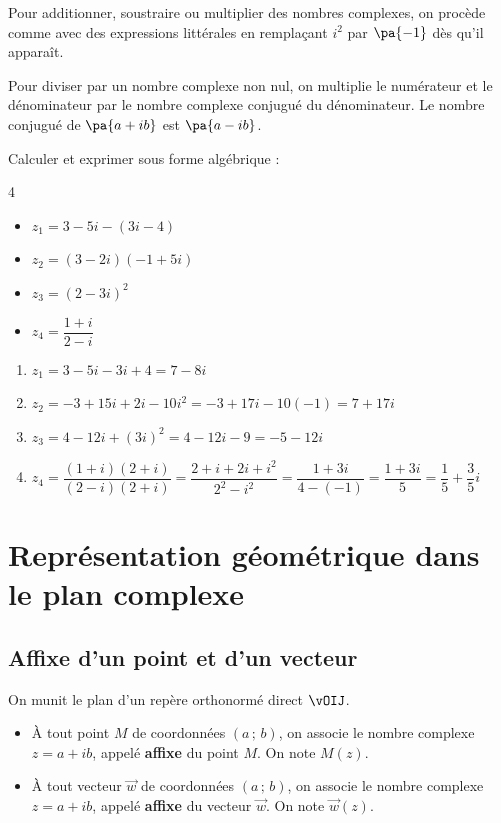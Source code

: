 \begin{methode}
	Pour additionner, soustraire ou multiplier des nombres complexes, on procède comme avec des expressions littérales en remplaçant $i^2$ par $\pa{-1}$ dès qu'il apparaît.

	Pour diviser par un nombre complexe non nul, on multiplie le numérateur et le dénominateur par le nombre complexe conjugué du dénominateur. Le nombre conjugué de $\pa{a+ib}$ est $\pa{a-ib}$.

	Calculer et exprimer sous forme algébrique :
	\begin{multicols}{4}
		\begin{itemize}
			\item $z_1 = 3 - 5i - (3i - 4)$
			\item $z_2 = (3 - 2i)(-1 + 5i)$
			\item $z_3 = (2 - 3i)^2$
			\item $z_4 = \dfrac{1 + i}{2 - i}$
		\end{itemize}
	\end{multicols}

	\ms

	\begin{correction}
		\nline
		\begin{enumerate}
			\item $z_1 = 3 - 5i - 3i + 4 = 7 - 8i$
			\item $z_2 = -3 + 15i + 2i - 10i^2 = -3 + 17i - 10(-1) = 7 + 17i$
			\item $z_3 = 4 - 12i + (3i)^2 = 4 - 12i - 9 = -5 - 12i$
			\item $z_4 = \dfrac{(1 + i)(2 + i)}{(2 - i)(2 + i)} = \dfrac{2 + i + 2i + i^2}{2^2 - i^2} = \dfrac{1 + 3i}{4 - (-1)} = \dfrac{1 + 3i}{5} = \dfrac{1}{5} + \dfrac{3}{5}i$
		\end{enumerate}
	\end{correction}
\end{methode}

\section{Représentation géométrique dans le plan complexe}

\subsection{Affixe d'un point et d'un vecteur}

\begin{defin}
	On munit le plan d'un repère orthonormé direct $\vOIJ$.
	\begin{itemize}
		\item À tout point $M$ de coordonnées $(a\,;\,b)$, on associe le nombre complexe $z = a + ib$, appelé \textbf{affixe} du point $M$. On note $M(z)$.
		\item À tout vecteur $\vec{w}$ de coordonnées $(a\,;\,b)$, on associe le nombre complexe $z = a + ib$, appelé \textbf{affixe} du vecteur $\vec{w}$. On note $\vec{w}(z)$.
	\end{itemize}
\end{defin}

